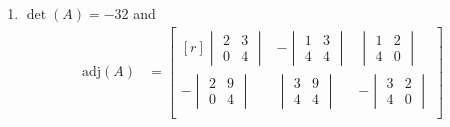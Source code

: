 \begin{Answer}
\begin{enumerate}[label=(\alph*)]
\begin{align*}
\begin{array}{@{}wc{11pt}wc{11pt}wc{11pt}|wc{11pt}wc{11pt}wc{11pt}@{}}
0 & 1 & 1 & 0 & \frac{1}{2} & -\frac{1}{8}
\end{array}\right] & 
\begin{aligned}
-\frac{1}{4}R_2 &\to R_2\\
-\frac{1}{8}R_3 &\to R_3    
\end{aligned} \\
\to & 
\left[\begin{array}{@{}wc{11pt}wc{11pt}wc{11pt}|wc{11pt}wc{11pt}wc{11pt}@{}}
1 & 2 & 3 & 0 & 1 & 0 \\
0 & 1 & 0 & -\frac{1}{4} & \frac{3}{4} & 0 \\
0 & 0 & 1 & \frac{1}{4} & -\frac{1}{4} & -\frac{1}{8}
\end{array}\right] & 
R_3 - R_2 \to R_3 \\
\to &
\left[\begin{array}{@{}wc{11pt}wc{11pt}wc{11pt}|wc{11pt}wc{11pt}wc{11pt}@{}}
1 & 0 & 0 & -\frac{1}{4} & \frac{1}{4} & \frac{3}{8} \\
0 & 1 & 0 & -\frac{1}{4} & \frac{3}{4} & 0 \\
0 & 0 & 1 & \frac{1}{4} & -\frac{1}{4} & -\frac{1}{8}
\end{array}\right] & 
R_1 - 3R_3 - 2R_2 \to R_1 
\end{align*}
\item $\det(A) = -32$ and
\begin{align*}
\text{adj}(A) &=
\begin{bmatrix*}[r]
\begin{vmatrix}
2 & 3 \\
0 & 4
\end{vmatrix} &
-\begin{vmatrix}
1 & 3 \\
4 & 4
\end{vmatrix} &
\begin{vmatrix}
1 & 2 \\
4 & 0
\end{vmatrix} 
\\[10pt]
-\begin{vmatrix}
2 & 9 \\
0 & 4
\end{vmatrix} &
\begin{vmatrix}
3 & 9 \\
4 & 4
\end{vmatrix} &
-\begin{vmatrix}
3 & 2 \\
4 & 0
\end{vmatrix}
\\[10pt]

\end{bmatrix*}
\end{align*}
\end{enumerate}
\end{Answer}

